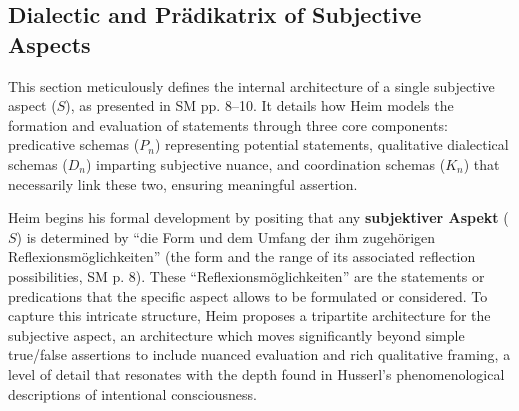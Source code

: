 \documentclass[12pt]{article}
\newcommand{\q}[1]{\enquote{#1}}
\newcommand{\subjektiveraspekt}{S}
\newcommand{\pradikatrix}{P}
\newcommand{\dialektik}{D}
\newcommand{\koordination}{K}
\begin{document}
\subsection{Dialectic and Prädikatrix of Subjective Aspects}
\label{sec:dialektik_pradikatrix}

This section meticulously defines the internal architecture of a single subjective aspect (\(\subjektiveraspekt\)), as presented in SM pp. 8--10. It details how Heim models the formation and evaluation of statements through three core components: predicative schemas (\(\pradikatrix_n\)) representing potential statements, qualitative dialectical schemas (\(\dialektik_n\)) imparting subjective nuance, and coordination schemas (\(\koordination_n\)) that necessarily link these two, ensuring meaningful assertion.

Heim begins his formal development by positing that any \textbf{subjektiver Aspekt} (\(\subjektiveraspekt\)) is determined by \q{die Form und dem Umfang der ihm zugehörigen Reflexionsmöglichkeiten} (the form and the range of its associated reflection possibilities, SM p. 8). These \q{Reflexionsmöglichkeiten} are the statements or predications that the specific aspect allows to be formulated or considered. To capture this intricate structure, Heim proposes a tripartite architecture for the subjective aspect, an architecture which moves significantly beyond simple true/false assertions to include nuanced evaluation and rich qualitative framing, a level of detail that resonates with the depth found in Husserl's phenomenological descriptions of intentional consciousness.
\end{document}
